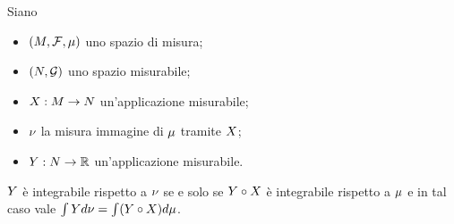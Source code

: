 \begin{Theorem}
  Siano
  \begin{itemize}
    \item $(M,\mathcal{F},\mu)$ uno spazio di misura;
    \item $(N,\mathcal{G})$ uno spazio misurabile;
    \item $X: M \rightarrow N$
      un'applicazione misurabile;
    \item $\nu$ la misura immagine di $\mu$ tramite
      $X$;
    \item $Y:
      N \rightarrow \mathbb{R}$
      un'applicazione misurabile.
  \end{itemize}
  $Y$ \`e integrabile rispetto a
  $\nu$ se e solo se
  $Y \circ X$
  \`e integrabile rispetto a
  $\mu$ e in tal caso vale
  $\int Y d\nu
    = \int (Y \circ X)  d\mu$.
\end{Theorem}
